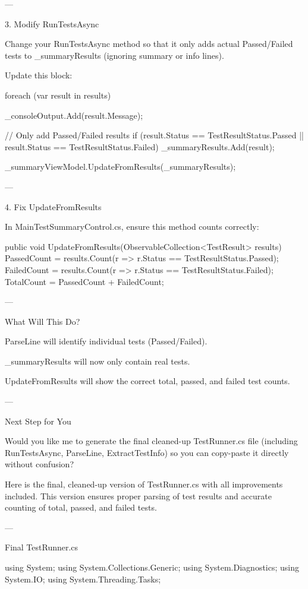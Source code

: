 ---

3. Modify RunTestsAsync

Change your RunTestsAsync method so that it only adds actual Passed/Failed tests to _summaryResults (ignoring summary or info lines).

Update this block:

foreach (var result in results)
{
    _consoleOutput.Add(result.Message);

    // Only add Passed/Failed results
    if (result.Status == TestResultStatus.Passed || result.Status == TestResultStatus.Failed)
    {
        _summaryResults.Add(result);
    }
}
_summaryViewModel.UpdateFromResults(_summaryResults);


---

4. Fix UpdateFromResults

In MainTestSummaryControl.cs, ensure this method counts correctly:

public void UpdateFromResults(ObservableCollection<TestResult> results)
{
    PassedCount = results.Count(r => r.Status == TestResultStatus.Passed);
    FailedCount = results.Count(r => r.Status == TestResultStatus.Failed);
    TotalCount = PassedCount + FailedCount;
}


---

What Will This Do?

ParseLine will identify individual tests (Passed/Failed).

_summaryResults will now only contain real tests.

UpdateFromResults will show the correct total, passed, and failed test counts.



---

Next Step for You

Would you like me to generate the final cleaned-up TestRunner.cs file (including RunTestsAsync, ParseLine, ExtractTestInfo) so you can copy-paste it directly without confusion?


Here is the final, cleaned-up version of TestRunner.cs with all improvements included. This version ensures proper parsing of test results and accurate counting of total, passed, and failed tests.


---

Final TestRunner.cs

using System;
using System.Collections.Generic;
using System.Diagnostics;
using System.IO;
using System.Threading.Tasks;

